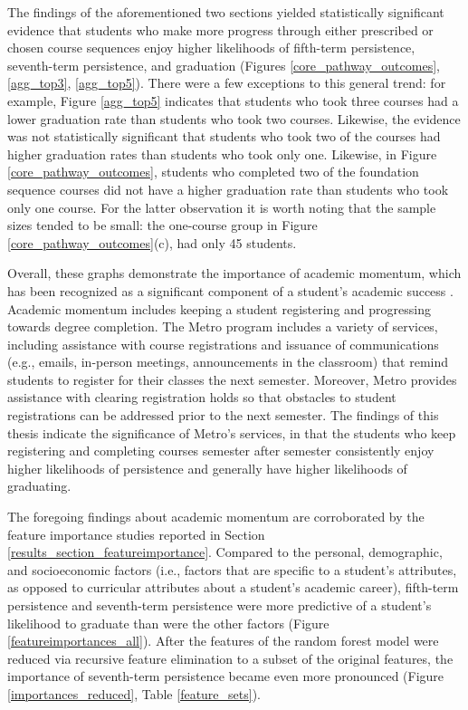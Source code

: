The findings of the aforementioned two sections yielded statistically significant evidence that students who make more progress through either prescribed or chosen course sequences enjoy higher likelihoods of fifth-term persistence, seventh-term persistence, and graduation (Figures \ref{core_pathway_outcomes}, \ref{agg_top3}, \ref{agg_top5}).  There were a few exceptions to this general trend: for example, Figure \ref{agg_top5} indicates that students who took three courses had a lower graduation rate than students who took two courses.  Likewise, the evidence was not statistically significant that students who took two of the courses had higher graduation rates than students who took only one.   Likewise, in Figure \ref{core_pathway_outcomes}, students who completed two of the foundation sequence courses did not have a higher graduation rate than students who took only one course.  For the latter observation it is worth noting that the sample sizes tended to be small: the one-course group in Figure \ref{core_pathway_outcomes}(c), had only 45 students.  

Overall, these graphs demonstrate the importance of academic momentum, which has been recognized as a significant component of a student's academic success \cite{Kolenovic}.  Academic momentum includes keeping a student registering and progressing towards degree completion.  The Metro program includes a variety of services, including assistance with course registrations and issuance of communications (e.g., emails, in-person meetings, announcements in the classroom) that remind students to register for their classes the next semester.  Moreover, Metro provides assistance with clearing registration holds so that obstacles to student registrations can be addressed prior to the next semester.  The findings of this thesis indicate the significance of Metro's services, in that the students who keep registering and completing courses semester after semester consistently enjoy higher likelihoods of persistence and generally have higher likelihoods of graduating.  

The foregoing findings about academic momentum are corroborated by the feature importance studies reported in Section \ref{results_section_featureimportance}.  Compared to the personal, demographic, and socioeconomic factors (i.e., factors that are specific to a student's attributes, as opposed to curricular attributes about a student's academic career), fifth-term persistence and seventh-term persistence were more predictive of a student's likelihood to graduate than were the other factors (Figure \ref{featureimportances_all}).  After the features of the random forest model were reduced via recursive feature elimination to a subset of the original features, the importance of seventh-term persistence became even more pronounced (Figure \ref{importances_reduced}, Table \ref{feature_sets}). 

